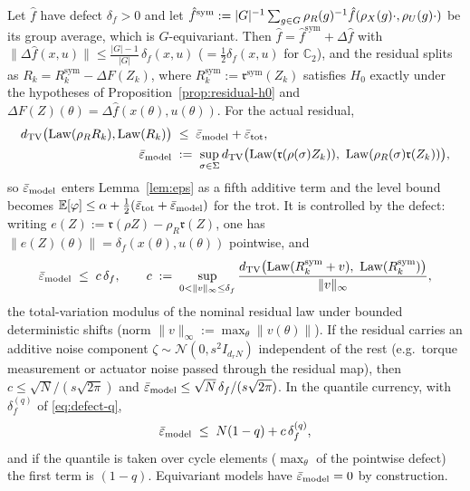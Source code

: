 \begin{corollary}
\label{cor:contamination}
Let $\hat f$ have defect $\delta_f > 0$ and let $\hat f^{\mathrm{sym}} :=
|G|^{-1}\sum_{g\in G} \rho_{R}(g)^{-1}\hat f(\rho_{X}(g)\cdot,\rho_{U}(g)\cdot)$ be its
group average, which is $G$-equivariant. Then $\hat f = \hat f^{\mathrm{sym}}
+ \Delta\hat f$ with $\|\Delta \hat f(x,u)\| \le \tfrac{|G|-1}{|G|}\,\delta_f(x,u)$
($=\tfrac12\delta_f(x,u)$ for $\mathbb{C}_2$), and the residual splits as
$R_k = R_k^{\mathrm{sym}} - \Delta F(Z_k)$, where $R^{\mathrm{sym}}_k :=
\mathfrak{r}^{\mathrm{sym}}(Z_k)$ satisfies $H_0$ exactly under the
hypotheses of Proposition~\ref{prop:residual-h0} and $\Delta F(Z)(\theta) =
\Delta\hat f(x(\theta),u(\theta))$. For the actual residual,
\begin{equation}
  \label{eq:eps-model}
  \begin{aligned}
  \dtv\bigl(\Law(\rho_R R_k), \Law(R_k)\bigr) \;&\le\;
  \epsbar{model} + \epsbar{tot},\\
  \epsbar{model} \;&:=\; \sup_{\sigma\in\symgrp}
  \dtv\bigl(\Law(\mathfrak{r}(\rho(\sigma)Z_k)),\ \Law(\rho_R(\sigma)\mathfrak{r}(Z_k))\bigr),
  \end{aligned}
\end{equation}
so $\bar\varepsilon_{\mathrm{model}}$ enters Lemma~\ref{lem:eps} as a fifth additive term and
the level bound becomes $\mathbb{E}[\varphi] \le \alpha + \tfrac12
(\bar\varepsilon_{\mathrm{tot}} + \bar\varepsilon_{\mathrm{model}})$ for the trot. It is controlled by the
defect: writing $e(Z) := \mathfrak{r}(\rho Z) - \rho_R\mathfrak{r}(Z)$, one has
$\|e(Z)(\theta)\| = \delta_f(x(\theta),u(\theta))$ pointwise, and
\begin{equation}
  \label{eq:c-delta}
  \epsbar{model} \;\le\; c\,\delta_f,
  \qquad
  c \;:=\; \sup_{0 < \|v\|_{\infty} \le \delta_f}
  \frac{\dtv\bigl(\Law(R_k^{\mathrm{sym}} + v),\ \Law(R_k^{\mathrm{sym}})\bigr)}{\|v\|_{\infty}} ,
\end{equation}
the total-variation modulus of the nominal residual law under bounded
deterministic shifts (norm $\|v\|_\infty := \max_\theta \|v(\theta)\|$). If
the residual carries an additive noise component $\zeta \sim
\mathcal{N}(0, s^2 I_{d_r N})$ independent of the rest (e.g.\ torque
measurement or actuator noise passed through the residual map), then
$c \le \sqrt{N}/(s\sqrt{2\pi})$ and $\bar\varepsilon_{\mathrm{model}} \le \sqrt{N}\,\delta_f/(s\sqrt{2\pi})$.
In the quantile currency, with $\delta_f^{(q)}$ of \eqref{eq:defect-q},
\begin{equation}
  \label{eq:c-delta-q}
  \bar\varepsilon_{\mathrm{model}} \;\le\; N(1-q) + c\,\delta_f^{(q)} ,
\end{equation}
and if the quantile is taken over cycle elements ($\max_\theta$ of the
pointwise defect) the first term is $(1-q)$. Equivariant models have
$\bar\varepsilon_{\mathrm{model}} = 0$ by construction.
\end{corollary}

